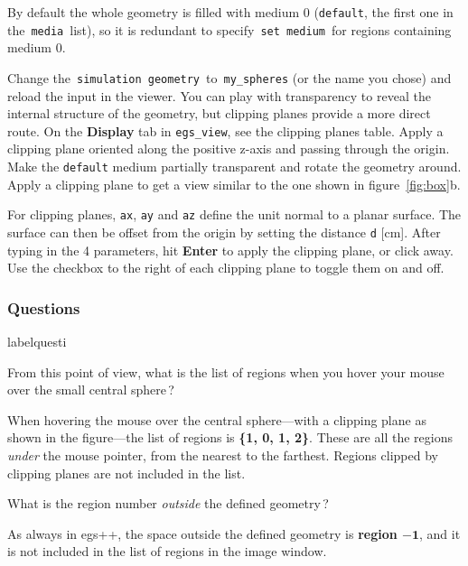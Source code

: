 \documentclass[12pt,twoside]{article}
\makeatletter
\renewcommand\thequesti         {\@arabic\c@questi}
\newenvironment{question}{
    \bfseries
    \edef\@questictr{questi}
    \expandafter
    \list \csname label\@questictr\endcsname {
        \usecounter\@questictr\def\makelabel##1{\hss\llap{##1}}
        \savebox{\questbox}             {\thequesti}
        \setlength\labelsep             {0.6em}
        \setlength\labelwidth           {\wd\questbox}
        \setlength\leftmargini          {\labelwidth}
        \addtolength{\leftmargini}      {\labelsep}
        \addtolength{\leftmargini}      {0.2em}
        \leftmargin\leftmargini
        \setlength\topsep               {1em}
        \setlength\itemsep              {1.2em}
        \setlength\parsep               {0.5em}
    }
}{\normalfont\endlist}
\newenvironment{answer}{\normalfont}{\relax}
\makeatother
\begin{document}
By default the whole geometry is filled with medium 0 (\Verb|default|, the first
one in the \,\Verb|media|\, list), so it is redundant to specify
\,\Verb|set medium|\, for regions containing medium 0.

Change the \,\Verb|simulation geometry|\, to \,\Verb|my_spheres| (or the name
you
chose) and reload the input in the viewer. You can play with transparency to
reveal the internal structure of the geometry, but clipping planes provide a
more direct route. On the \textbf{Display} tab in \Verb|egs_view|, see the
clipping planes table. Apply a clipping plane oriented along the positive z-axis
and passing through the origin. Make the \Verb|default| medium partially
transparent and rotate the geometry around. Apply a clipping plane to get a view
similar to the one shown in figure~\ref{fig:box}b.

For clipping planes, \Verb|ax|, \Verb|ay| and \Verb|az| define the unit normal
to a planar surface. The surface can then be offset from the origin by setting
the distance \Verb|d| [cm]. After typing in the 4 parameters, hit \textbf{Enter}
to apply the clipping plane, or click away. Use the checkbox to the right of each clipping
plane to toggle them on and off.

\subsubsection{Questions}

\begin{question}

\item From this point of view, what is the list of regions when you hover your
mouse over the small central sphere\,?

\begin{answer}
When hovering the mouse over the central sphere---with a clipping plane as
shown in the figure---the list of regions is \textbf{\{1, 0, 1, 2\}}. These are
all the regions \textit{under} the mouse pointer, from the nearest to the
farthest. Regions clipped by clipping planes are not included in the list.
\end{answer}

\item What is the region number \textit{outside} the defined geometry\,?

\begin{answer}
As always in egs++, the space outside the defined geometry is \textbf{region
$\mathbf{-1}$}, and it is not included in the list of regions in the image
window.
\end{answer}

\end{question}
\end{document}
